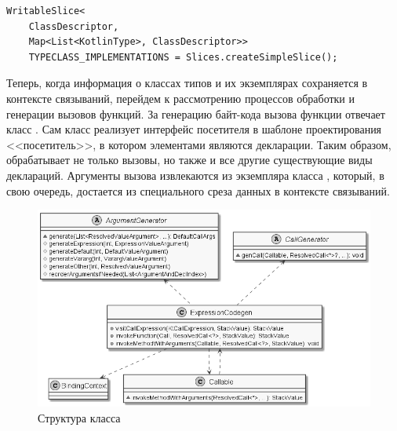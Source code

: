% 
\begin{lstlisting}[style={wo_caption}]
WritableSlice<
    ClassDescriptor, 
    Map<List<KotlinType>, ClassDescriptor>> 
    TYPECLASS_IMPLEMENTATIONS = Slices.createSimpleSlice();
\end{lstlisting}

Теперь, когда информация о классах типов и их экземплярах сохраняется в контексте связываний, перейдем к рассмотрению процессов обработки и генерации вызовов функций. За генерацию байт-кода вызова функции отвечает класс . Сам класс реализует интерфейс посетителя в шаблоне проектирования <<посетитель>>, в котором элементами являются декларации. Таким образом,  обрабатывает не только вызовы, но также и все другие существующие виды деклараций. Аргументы вызова извлекаются из экземпляра класса , который, в свою очередь, достается из специального среза данных в контексте связываний.     

\begin{figure}[htbp]
    \centering
    \includegraphics[width=\textwidth]{resources/06/11_expression_codegen.png}
    \caption{Структура класса }
    \label{fig:expression-codegen}
\end{figure}


